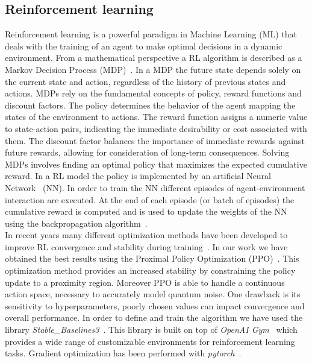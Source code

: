 \documentclass[referee,sn-basic]{sn-jnl} %
\begin{document}
\subsection{Reinforcement learning}\label{sec_rl}
Reinforcement learning is a powerful paradigm in Machine Learning (ML) that deals with the training of an agent to make optimal decisions in a dynamic environment. From a mathematical perspective a RL algorithm is described as a Markov Decision Process (MDP)~\cite{PUTERMAN1990331}. In a MDP the future state depends solely on the current state and action, regardless of the history of previous states and actions. MDPs rely on the fundamental concepts of policy, reward functions and discount factors. The policy determines the behavior of the agent mapping the states of the environment to actions. The reward function assigns a numeric value to state-action pairs, indicating the immediate desirability or cost associated with them. The discount factor balances the importance of immediate rewards against future rewards, allowing for consideration of long-term consequences. Solving MDPs involves finding an optimal policy that maximizes the expected cumulative reward.
In a RL model the policy is implemented by an artificial Neural Network~\cite{Zou2009} (NN). In order to train the NN different episodes of agent-environment interaction are executed. At the end of each episode (or batch of episodes) the cumulative reward is computed and is used to update the weights of the NN using the backpropagation algorithm~\cite{Rojas1996}.\\
In recent years many different optimization methods have been developed to improve RL convergence and stability during training~\cite{ozalp2020}. In our work we have obtained the best results using the Proximal Policy Optimization (PPO)~\cite{schulman2017proximal}. This optimization method provides an increased stability by constraining the policy update to a proximity region. Moreover PPO is able to handle a continuous action space, necessary to accurately model quantum noise. One drawback is its sensitivity to hyperparameters, poorly chosen values can impact convergence and overall performance. In order to define and train the algorithm we have used the library \textit{Stable\_Baselines3}~\cite{JMLR:v22:20-1364}. This library is built on top of \textit{OpenAI Gym}~\cite{article_gym} which provides a wide range of customizable environments for reinforcement learning tasks. Gradient optimization has been performed with \textit{pytorch}~\cite{NEURIPS2019_9015}.
\end{document}
